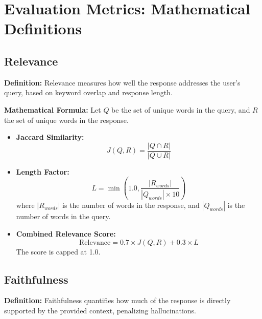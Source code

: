 
\section{Evaluation Metrics: Mathematical Definitions}

\subsection{Relevance}
\textbf{Definition:} Relevance measures how well the response addresses the user's query, based on keyword overlap and response length.

\textbf{Mathematical Formula:}
Let $Q$ be the set of unique words in the query, and $R$ the set of unique words in the response.
\begin{itemize}
    \item \textbf{Jaccard Similarity:}
    \[
    J(Q, R) = \frac{|Q \cap R|}{|Q \cup R|}
    \]
    \item \textbf{Length Factor:}
    \[
    L = \min\left(1.0, \frac{|R_{words}|}{|Q_{words}| \times 10}\right)
    \]
    where $|R_{words}|$ is the number of words in the response, and $|Q_{words}|$ is the number of words in the query.
    \item \textbf{Combined Relevance Score:}
    \[
    \text{Relevance} = 0.7 \times J(Q, R) + 0.3 \times L
    \]
    The score is capped at 1.0.
\end{itemize}

\subsection{Faithfulness}
\textbf{Definition:} Faithfulness quantifies how much of the response is directly supported by the provided context, penalizing hallucinations.

